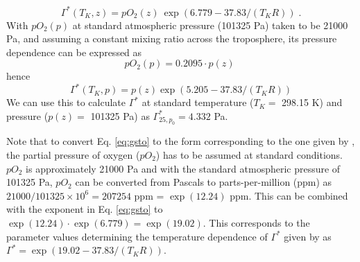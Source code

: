 \documentclass{myreport}
\begin{document}
\begin{equation}
    \label{eq:gsto}
    \Gamma^\ast(T_K, z) = pO_2(z)\: \exp(6.779-37.83/(T_K R))\;.
\end{equation}
With $pO_2(p)$ at standard atmospheric pressure (101325 Pa) taken to be 21000 Pa, and assuming a constant mixing ratio across the troposphere, its pressure dependence can be expressed as 
\begin{equation}
    \label{eq:oxy}
    pO_2(p) = 0.2095 \cdot p(z)\;
\end{equation}
hence
\begin{equation}
    \label{eq:gstop}
    \Gamma^\ast(T_K, p) = p(z) \exp(5.205-37.83/(T_K R))  %
\end{equation}
We can use this to calculate $\Gamma^\ast$ at standard temperature ($T_K=$ 298.15 K) and pressure ($p(z)=$ 101325 Pa) as $\Gamma^\ast_{25, p_0} = 4.332$ Pa. 

Note that to convert Eq. \ref{eq:gsto} to the form corresponding to the one given by \citet{bernacchi01}, the partial pressure of oxygen ($pO_2$) has to be assumed at standard conditions. $pO_2$ is approximately 21000 Pa and with the standard atmospheric pressure of 101325 Pa, $pO_2$ can be converted from Pascals to parts-per-million (ppm) as $21000/101325 \times 10^6 = 207254$ ppm = $\exp(12.24)$ ppm. This can be combined with the exponent in Eq. \ref{eq:gsto} to $\exp(12.24) \cdot \exp(6.779) = \exp(19.02)$. This corresponds to the parameter values determining the temperature dependence of $\Gamma^\ast$ given by \citet{bernacchi01} as  $\Gamma^\ast = \exp(19.02-37.83/(T_K R))$.





\end{document}
